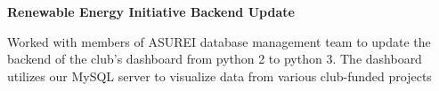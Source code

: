 \begin{cventries}
  \cventry
    {\textbf{Renewable Energy Initiative Backend Update}} %
    {} %
    {} %
    {} %
    {
      \begin{cvitems} %
        \item {Worked with members of ASUREI database management team to update the backend of the club's dashboard from python 2 to python 3. The dashboard utilizes our MySQL server to visualize data from various club-funded projects}
      \end{cvitems}
    }


\end{cventries}
